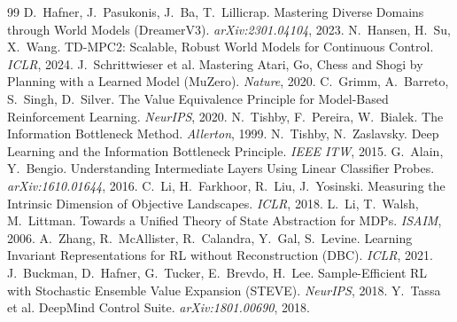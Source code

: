 \documentclass[letterpaper]{article}
\begin{document}
\begin{thebibliography}{99}\small
{} D.~Hafner, J.~Pasukonis, J.~Ba, T.~Lillicrap.
Mastering Diverse Domains through World Models (DreamerV3). \emph{arXiv:2301.04104}, 2023.
 N.~Hansen, H.~Su, X.~Wang. TD-MPC2: Scalable,
Robust World Models for Continuous Control. \emph{ICLR}, 2024.
 J.~Schrittwieser et al. Mastering Atari, Go,
Chess and Shogi by Planning with a Learned Model (MuZero). \emph{Nature}, 2020.
 C.~Grimm, A.~Barreto, S.~Singh, D.~Silver. The Value
Equivalence Principle for Model-Based Reinforcement Learning. \emph{NeurIPS}, 2020.
 N.~Tishby, F.~Pereira, W.~Bialek. The Information
Bottleneck Method. \emph{Allerton}, 1999.
 N.~Tishby, N.~Zaslavsky. Deep Learning and the
Information Bottleneck Principle. \emph{IEEE ITW}, 2015.
 G.~Alain, Y.~Bengio. Understanding Intermediate
Layers Using Linear Classifier Probes. \emph{arXiv:1610.01644}, 2016.
 C.~Li, H.~Farkhoor, R.~Liu, J.~Yosinski. Measuring
the Intrinsic Dimension of Objective Landscapes. \emph{ICLR}, 2018.
 L.~Li, T.~Walsh, M.~Littman. Towards a Unified
Theory of State Abstraction for MDPs. \emph{ISAIM}, 2006.
 A.~Zhang, R.~McAllister, R.~Calandra, Y.~Gal, S.~Levine.
Learning Invariant Representations for RL without Reconstruction (DBC).
\emph{ICLR}, 2021.
 J.~Buckman, D.~Hafner, G.~Tucker, E.~Brevdo, H.~Lee.
Sample-Efficient RL with Stochastic Ensemble Value Expansion (STEVE). \emph{NeurIPS}, 2018.
 Y.~Tassa et al. DeepMind Control Suite.
\emph{arXiv:1801.00690}, 2018.
\end{thebibliography}
\end{document}
